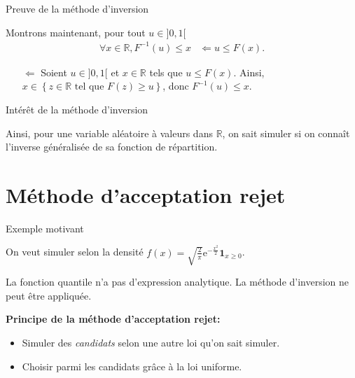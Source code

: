 \documentclass[ignorenonframetext,]{beamer}
\providecommand{\tightlist}{%
  \setlength{\itemsep}{0pt}\setlength{\parskip}{0pt}}
\newcommand{\R}{\mathbb{R}}
\begin{document}
\begin{frame}{Preuve de la méthode d'inversion}
\protect\hypertarget{preuve-de-la-muxe9thode-dinversion-2}{}

Montrons maintenant, pour tout \(u \in ]0, 1[\) \begin{align*}
\forall x \in \R,F^{-1}(u) \leq x &\Leftarrow u \leq F(x).
\end{align*}\pause

\begin{itemize}
\item[$\Leftarrow$] Soient $u \in ]0, 1[$ et $x\in \R$ tels que $u \leq F(x)$.\newline
Ainsi, $x\in\left\lbrace z \in \R \text{ tel que } F(z) \geq u \right\rbrace$, donc $F^{-1}(u) \leq x$.
\end{itemize}

\end{frame}

\begin{frame}{Intérêt de la méthode d'inversion}
\protect\hypertarget{intuxe9ruxeat-de-la-muxe9thode-dinversion}{}

Ainsi, pour une variable aléatoire à valeurs dans \(\mathbb{R}\), on
sait simuler si on connaît l'inverse généralisée de sa fonction de
répartition.

\end{frame}

\hypertarget{muxe9thode-dacceptation-rejet}{%
\section{Méthode d'acceptation
rejet}\label{muxe9thode-dacceptation-rejet}}

\begin{frame}{Exemple motivant}
\protect\hypertarget{exemple-motivant}{}

On veut simuler selon la densité
\(f(x) = \sqrt{\frac{2}{\pi}}\text{e}^{-\frac{x^2}{2}}\mathbf{1}_{x \geq 0}\).

La fonction quantile n'a pas d'expression analytique. La méthode
d'inversion ne peut être appliquée.\pause

\textbf{Principe de la méthode d'acceptation rejet:}

\begin{itemize}
\tightlist
\item
  Simuler des \emph{candidats} selon une autre loi qu'on sait simuler.
  \pause 
\item
  Choisir parmi les candidats grâce à la loi uniforme.
\end{itemize}

\end{frame}
\end{document}
